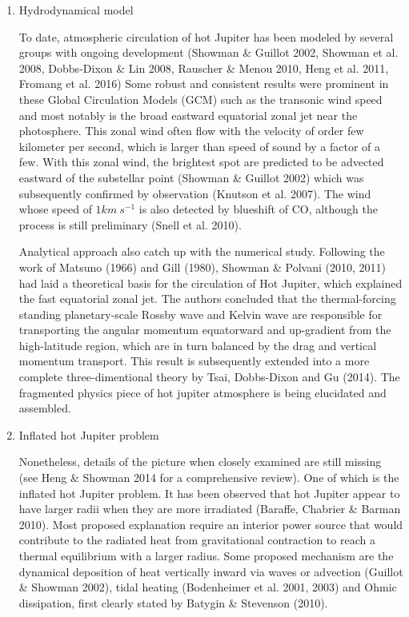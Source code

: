 \documentclass[11pt]{article}
\begin{document}
\begin{enumerate}
\item Hydrodynamical model

To date, atmospheric circulation of hot Jupiter has been modeled by several groups with ongoing development (Showman \& Guillot 2002, Showman et al. 2008, Dobbs-Dixon \& Lin 2008, Rauscher \& Menou 2010, Heng et al. 2011, Fromang et al. 2016) Some robust and consistent results were  prominent in these Global Circulation Models (GCM) such as the transonic wind speed and most notably is the broad eastward equatorial zonal jet near the photosphere. This zonal wind often flow with the velocity of order few kilometer per second, which is larger than speed of sound by a factor of a few. With this zonal wind, the brightest spot are predicted to be advected eastward of the substellar point (Showman \& Guillot 2002) which was subsequently confirmed by observation (Knutson et al. 2007). The wind whose speed of $1km \ s^{-1}$ is also detected by blueshift of CO, although the process is still preliminary (Snell et al. 2010). 

Analytical approach also catch up with the numerical study. Following the work of Matsuno (1966) and Gill (1980), Showman \& Polvani (2010, 2011) had laid a theoretical basis for the circulation of Hot Jupiter, which explained the fast equatorial zonal jet. The authors concluded that the thermal-forcing standing planetary-scale Rossby wave and Kelvin wave are responsible for transporting the angular momentum equatorward and up-gradient from the high-latitude region, which are in turn balanced by the drag and vertical momentum transport. This result is subsequently extended into a more complete three-dimentional theory by Tsai, Dobbs-Dixon and Gu (2014). The fragmented physics piece of hot jupiter atmosphere is being elucidated and assembled.

\item Inflated hot Jupiter problem

Nonetheless, details of the picture when closely examined are still missing  (see Heng \& Showman 2014 for a comprehensive review). One of which is the inflated hot Jupiter  problem. It has been observed that hot Jupiter appear to have larger radii when they are more irradiated (Baraffe, Chabrier \& Barman 2010). Most proposed explanation require an interior power source that would contribute to the radiated heat from gravitational contraction to reach a thermal equilibrium with a larger radius. 
Some proposed mechanism are the dynamical deposition of heat vertically inward via waves or advection (Guillot \& Showman 2002), tidal heating (Bodenheimer et al. 2001, 2003) and Ohmic dissipation, first clearly stated by Batygin \& Stevenson (2010).  


\end{enumerate}
\end{document}
